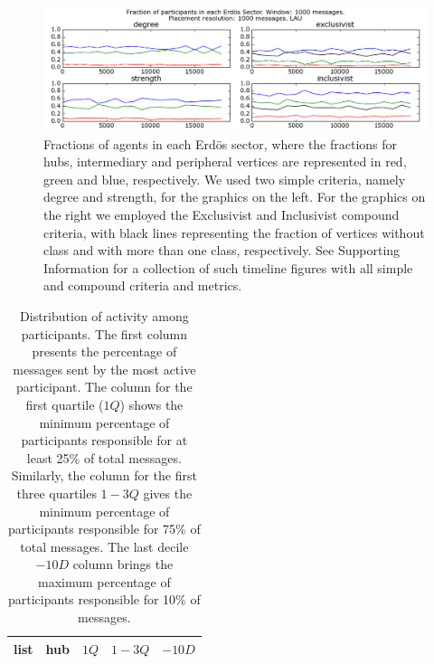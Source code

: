 \documentclass[%
	aip,
	jmp,%
	amsmath,amssymb,
	reprint,%
]{revtex4-1}
\begin{document}
\begin{figure} 
	\centering
	\includegraphics[width=\textwidth]{figs/InText-WLAU-S1000}
	\caption{Fractions of agents in each Erd\"os sector, where the fractions for hubs, intermediary and peripheral vertices are represented in red, green and blue, respectively. We used two simple criteria, namely degree and strength, for the graphics on the left. For the graphics on the right we employed the Exclusivist and Inclusivist compound criteria, with black lines representing the fraction of vertices without class and with more than one class, respectively. See Supporting Information for a collection of such timeline figures with all simple and compound criteria and metrics.}
	\label{fig:sectIL}
\end{figure}


\begin{table}[h]
	\caption{Distribution of activity among participants. The first column presents the percentage of messages sent by the most active participant. The column for the first quartile ($1Q$) shows the minimum percentage of participants responsible for at least 25\% of total messages. Similarly, the column for the first three quartiles $1-3Q$ gives the minimum percentage of participants responsible for 75\% of total messages. The last decile $-10D$ column brings the maximum percentage of participants responsible for 10\% of messages.}
	\begin{center}
		\begin{tabular}{ | l ||  c | c | c | c | }
			\hline
			list & hub & $ 1Q $ & $ 1-3Q $ & $-10D$ \\ \hline
			
		\end{tabular}
	\end{center}
	\label{autores}
\end{table}
\end{document}
